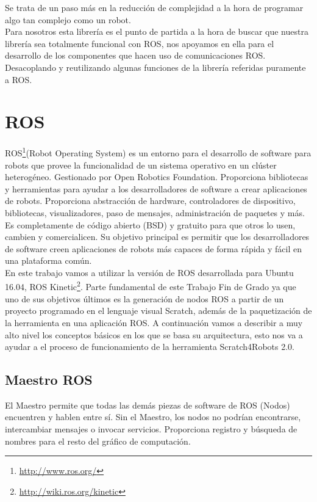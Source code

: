 Se trata de un paso más en la reducción de complejidad a la hora de programar algo tan complejo como un robot.\\

Para nosotros esta librería es el punto de partida a la hora de buscar que nuestra librería sea totalmente funcional con ROS, nos apoyamos en ella para el desarrollo de los componentes que hacen uso de comunicaciones ROS. Desacoplando y reutilizando algunas funciones de la librería referidas puramente a ROS.


\section{ROS}
\label{sec:ros}
ROS\footnote{\url{http://www.ros.org/}}(Robot Operating System) es un entorno para el desarrollo de software para robots que provee la funcionalidad de un sistema operativo en un clúster heterogéneo. Gestionado por Open Robotics Foundation. Proporciona bibliotecas y herramientas para ayudar a los desarrolladores de software a crear aplicaciones de robots. Proporciona abstracción de hardware, controladores de dispositivo, bibliotecas, visualizadores, paso de mensajes, administración de paquetes y más.\\

Es completamente de código abierto (BSD) y gratuito para que otros lo usen, cambien y comercialicen. Su objetivo principal es permitir que los desarrolladores de software creen aplicaciones de robots más capaces de forma rápida y fácil en una plataforma común. \\

En este trabajo vamos a utilizar la versión de ROS desarrollada para Ubuntu 16.04, ROS Kinetic\footnote{\url{http://wiki.ros.org/kinetic}}. Parte fundamental de este Trabajo Fin de Grado ya que uno de sus objetivos últimos es la generación de nodos ROS a partir de un proyecto programado en el lenguaje visual Scratch, además de la paquetización de la herramienta en una aplicación ROS. A continuación vamos a describir a muy alto nivel los conceptos básicos en los que se basa su arquitectura, esto nos va a ayudar a el proceso de funcionamiento de la herramienta Scratch4Robots 2.0.\\


\subsection{Maestro ROS}
El Maestro permite que todas las demás piezas de software de ROS (Nodos) encuentren y hablen entre sí. Sin el Maestro, los nodos no podrían encontrarse, intercambiar mensajes o invocar servicios. Proporciona registro y búsqueda de nombres para el resto del gráfico de computación.

